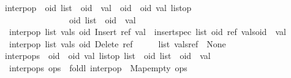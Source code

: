 \begin{isabelle}
\isamarkupfalse%
\ interp{\isacharunderscore}op\ {\isacharcolon}{\isacharcolon}\ {\isachardoublequoteopen}{\isacharparenleft}{\isacharprime}oid\ list\ {\isasymtimes}\ {\isacharparenleft}{\isacharprime}oid\ {\isasymrightharpoonup}\ {\isacharprime}val{\isacharparenright}{\isacharparenright}\ {\isasymRightarrow}\ {\isacharparenleft}{\isacharprime}oid\ {\isasymtimes}\ {\isacharparenleft}{\isacharprime}oid{\isacharcomma}\ {\isacharprime}val{\isacharparenright}\ list{\isacharunderscore}op{\isacharparenright}\isanewline
\ \ \ \ \ \ \ \ \ \ \ \ \ \ \ {\isasymRightarrow}\ {\isacharparenleft}{\isacharprime}oid\ list\ {\isasymtimes}\ {\isacharparenleft}{\isacharprime}oid\ {\isasymrightharpoonup}\ {\isacharprime}val{\isacharparenright}{\isacharparenright}{\isachardoublequoteclose}\ \isanewline
\ \ {\isachardoublequoteopen}interp{\isacharunderscore}op\ {\isacharparenleft}list{\isacharcomma}\ vals{\isacharparenright}\ {\isacharparenleft}oid{\isacharcomma}\ Insert\ ref\ val{\isacharparenright}\ {\isacharequal}\ {\isacharparenleft}insert{\isacharunderscore}spec\ list\ {\isacharparenleft}oid{\isacharcomma}\ ref{\isacharparenright}{\isacharcomma}\ vals{\isacharparenleft}oid\ {\isasymmapsto}\ val{\isacharparenright}{\isacharparenright}{\isachardoublequoteclose}\ {\isacharbar}\isanewline
\ \ {\isachardoublequoteopen}interp{\isacharunderscore}op\ {\isacharparenleft}list{\isacharcomma}\ vals{\isacharparenright}\ {\isacharparenleft}oid{\isacharcomma}\ Delete\ ref\ \ \ \ {\isacharparenright}\ {\isacharequal}\ {\isacharparenleft}list{\isacharcomma}\ vals{\isacharparenleft}ref\ {\isacharcolon}{\isacharequal}\ None{\isacharparenright}{\isacharparenright}{\isachardoublequoteclose}\isanewline
\isanewline
{}\isamarkupfalse%
\ interp{\isacharunderscore}ops\ {\isacharcolon}{\isacharcolon}\ {\isachardoublequoteopen}{\isacharparenleft}{\isacharprime}oid\ {\isasymtimes}\ {\isacharparenleft}{\isacharprime}oid{\isacharcomma}\ {\isacharprime}val{\isacharparenright}\ list{\isacharunderscore}op{\isacharparenright}\ list\ {\isasymRightarrow}\ {\isacharparenleft}{\isacharprime}oid\ list\ {\isasymtimes}\ {\isacharparenleft}{\isacharprime}oid\ {\isasymrightharpoonup}\ {\isacharprime}val{\isacharparenright}{\isacharparenright}{\isachardoublequoteclose}\ \isanewline
\ \ {\isachardoublequoteopen}interp{\isacharunderscore}ops\ ops\ {\isasymequiv}\ foldl\ interp{\isacharunderscore}op\ {\isacharparenleft}{\isacharbrackleft}{\isacharbrackright}{\isacharcomma}\ Map{\isachardot}empty{\isacharparenright}\ ops{\isachardoublequoteclose}%
\end{isabelle}

